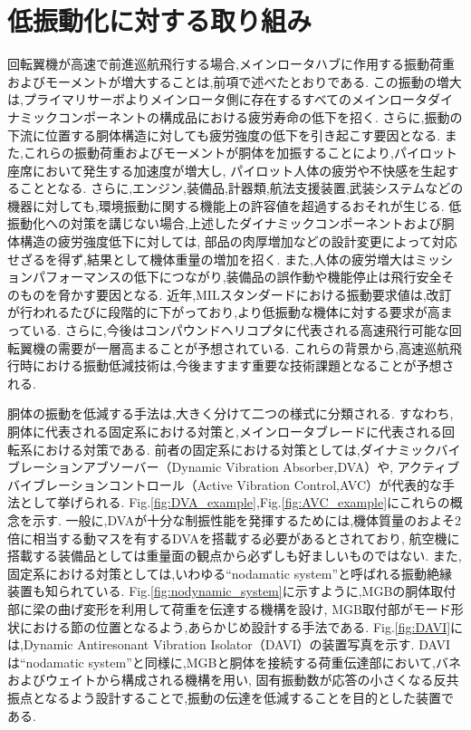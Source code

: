     \section{低振動化に対する取り組み}
    \label{sec:vibration_reduction}
    \par
    回転翼機が高速で前進巡航飛行する場合,メインロータハブに作用する振動荷重およびモーメントが増大することは,前項で述べたとおりである.
    この振動の増大は,プライマリサーボよりメインロータ側に存在するすべてのメインロータダイナミックコンポーネントの構成品における疲労寿命の低下を招く.
    さらに,振動の下流に位置する胴体構造に対しても疲労強度の低下を引き起こす要因となる.
    また,これらの振動荷重およびモーメントが胴体を加振することにより,パイロット座席において発生する加速度が増大し,
    パイロット人体の疲労や不快感を生起することとなる.
    さらに,エンジン,装備品,計器類,航法支援装置,武装システムなどの機器に対しても,環境振動に関する機能上の許容値を超過するおそれが生じる.
    低振動化への対策を講じない場合,上述したダイナミックコンポーネントおよび胴体構造の疲労強度低下に対しては,
    部品の肉厚増加などの設計変更によって対応せざるを得ず,結果として機体重量の増加を招く.
    また,人体の疲労増大はミッションパフォーマンスの低下につながり,装備品の誤作動や機能停止は飛行安全そのものを脅かす要因となる.
    近年,MILスタンダードにおける振動要求値は,改訂が行われるたびに段階的に下がっており,より低振動な機体に対する要求が高まっている.
    さらに,今後はコンパウンドヘリコプタに代表される高速飛行可能な回転翼機の需要が一層高まることが予想されている.
    これらの背景から,高速巡航飛行時における振動低減技術は,今後ますます重要な技術課題となることが予想される.

    \par
    胴体の振動を低減する手法は,大きく分けて二つの様式に分類される.
    すなわち,胴体に代表される固定系における対策と,メインロータブレードに代表される回転系における対策である.
    前者の固定系における対策としては,ダイナミックバイブレーションアブソーバー（Dynamic Vibration Absorber,DVA）や,
    アクティブバイブレーションコントロール（Active Vibration Control,AVC）が代表的な手法として挙げられる.
    Fig.\ref{fig:DVA_example},Fig.\ref{fig:AVC_example}にこれらの概念を示す.
    一般に,DVAが十分な制振性能を発揮するためには,機体質量のおよそ2倍に相当する動マスを有するDVAを搭載する必要があるとされており,
    航空機に搭載する装備品としては重量面の観点から必ずしも好ましいものではない.
    また,固定系における対策としては,いわゆる“nodamatic system”と呼ばれる振動絶縁装置も知られている.
    Fig.\ref{fig:nodynamic_system}に示すように,MGBの胴体取付部に梁の曲げ変形を利用して荷重を伝達する機構を設け,
    MGB取付部がモード形状における節の位置となるよう,あらかじめ設計する手法である.
    Fig.\ref{fig:DAVI}には,Dynamic Antiresonant Vibration Isolator（DAVI）の装置写真を示す. 
    DAVIは“nodamatic system”と同様に,MGBと胴体を接続する荷重伝達部において,バネおよびウェイトから構成される機構を用い,
    固有振動数が応答の小さくなる反共振点となるよう設計することで,振動の伝達を低減することを目的とした装置である.

